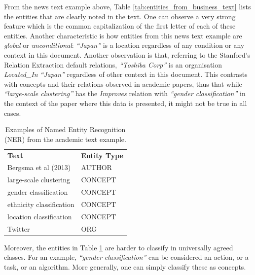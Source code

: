 \documentclass[11pt,a4paper,openright]{memoir}
\begin{document}
From the news text example above, Table \ref{tab:entities_from_business_text} lists the entities that are clearly noted in the text. One can observe a very strong feature which is the common capitalization of the first letter of each of these entities. Another characteristic is how entities from this news text example are \emph{global} or \emph{unconditional}: \emph{\enquote{Japan}} is a location regardless of any condition or any context in this document. Another observation is that, referring to the Stanford's Relation Extraction default relations, \emph{\enquote{Toshiba Corp}} is an organisation \emph{Located\_In} \emph{\enquote{Japan}} regardless of other context in this document. This contrasts with concepts and their relations observed in academic papers, thus that while \emph{\enquote{large-scale clustering}} has the \emph{Improves} relation with \emph{\enquote{gender classification}} in the context of the paper where this data is presented, it might not be true in all cases.

\begin{table}[!htbp]
  \centering
    \begin{tabular}{ll}
      \textbf{Text}             & \textbf{Entity Type} \\
      Bergsma et al (2013)      & AUTHOR          \\
      large-scale clustering    & CONCEPT         \\
      gender classification     & CONCEPT         \\
      ethnicity classification  & CONCEPT         \\
      location classification   & CONCEPT         \\
      Twitter                   & ORG             \\
    \end{tabular}
  \caption[NER from the academic text example.]{Examples of Named Entity Recognition (NER) from the academic text example.}
  \label{tab:entities_from_academic_text}
\end{table}

Moreover, the entities in Table \ref{tab:entities_from_academic_text} are harder to classify in universally agreed classes. For an example, \emph{\enquote{gender classification}} can be considered an action, or a task, or an algorithm. More generally, one can simply classify these as concepts.
\end{document}
